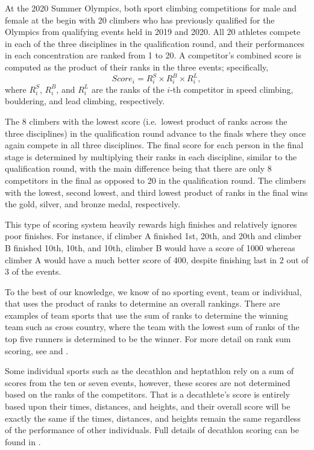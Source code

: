 \documentclass[12pt]{article}
\begin{document}
At the 2020 Summer Olympics, both sport climbing competitions for male
and female at the begin with 20 climbers who has previously qualified
for the Olympics from qualifying events held in 2019 and 2020. All 20
athletes compete in each of the three disciplines in the qualification
round, and their performances in each concentration are ranked from 1 to
20. A competitor's combined score is computed as the product of their
ranks in the three events; specifically, \begin{equation}
Score_i = R^S_i\times R^B_i\times R^L_i,
\end{equation} where \(R^S_i\), \(R^B_i\), and \(R^L_i\) are the ranks
of the \(i\)-th competitor in speed climbing, bouldering, and lead
climbing, respectively.

The 8 climbers with the lowest score (i.e.~lowest product of ranks
across the three disciplines) in the qualification round advance to the
finals where they once again compete in all three disciplines. The final
score for each person in the final stage is determined by multiplying
their ranks in each discipline, similar to the qualification round, with
the main difference being that there are only 8 competitors in the final
as opposed to 20 in the qualification round. The climbers with the
lowest, second lowest, and third lowest product of ranks in the final
wins the gold, silver, and bronze medal, respectively.

This type of scoring system heavily rewards high finishes and relatively
ignores poor finishes. For instance, if climber A finished 1st, 20th,
and 20th and climber B finished 10th, 10th, and 10th, climber B would
have a score of 1000 whereas climber A would have a much better score of
400, despite finishing last in 2 out of 3 of the events.

To the best of our knowledge, we know of no sporting event, team or
individual, that uses the product of ranks to determine an overall
rankings. There are examples of team sports that use the sum of ranks to
determine the winning team such as cross country, where the team with
the lowest sum of ranks of the top five runners is determined to be the
winner. For more detail on rank sum scoring, see \citet{hammond2007} and
\citet{boudreau2018}.

Some individual sports such as the decathlon and heptathlon rely on a
sum of scores from the ten or seven events, however, these scores are
not determined based on the ranks of the competitors. That is a
decathlete's score is entirely based upon their times, distances, and
heights, and their overall score will be exactly the same if the times,
distances, and heights remain the same regardless of the performance of
other individuals. Full details of decathlon scoring can be found in
\citet{westera2006}.
\end{document}
